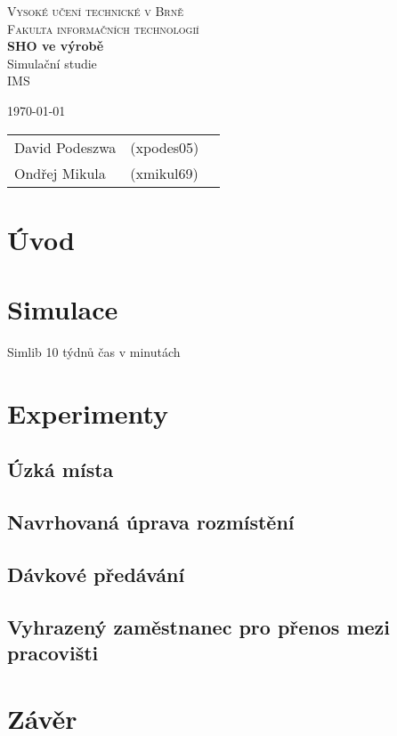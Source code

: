 \documentclass[11pt, a4paper]{article}
\begin{document}
\begin{titlepage}
\begin{center}
\Huge
\textsc{Vysoké učení technické v Brně}\\
\huge
\textsc{Fakulta informačních technologií}\\
\LARGE
{\bf SHO ve výrobě}\\Simulační studie\\IMS
{}
\end{center}
\Large
\today\hfill
\begin{tabular}{l l l}
		David Podeszwa & (xpodes05)\\
		Ondřej Mikula & (xmikul69)\\
\end{tabular}
\end{titlepage}

\newpage
\tableofcontents
\newpage


\section{Úvod}

\section{Simulace}
Simlib
10 týdnů
čas v minutách

\section{Experimenty}

\subsection{Úzká místa}

\subsection{Navrhovaná úprava rozmístění}

\subsection{Dávkové předávání}

\subsection{Vyhrazený zaměstnanec pro přenos mezi pracovišti}


\section{Závěr}
\end{document}
